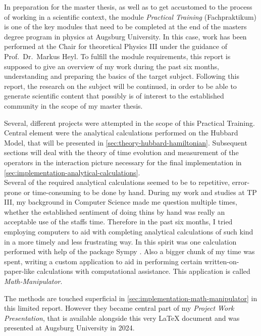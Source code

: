 In preparation for the master thesis, as well as to get accustomed to the process of working in a scientific context, the module \emph{Practical Training} (\glqq Fachpraktikum\grqq{}) is one of the key modules that need to be completed at the end of the masters degree program in physics at Augsburg University.
In this case, work has been performed at the Chair for theoretical Physics III under the guidance of  Prof.~Dr.~Markus Heyl.
To fulfill the module requirements, this report is supposed to give an overview of my work during the past six months, understanding and preparing the basics of the target subject.
Following this report, the research on the subject will be continued, in order to be able to generate scientific content that possibly is of interest to the established community in the scope of my master thesis.

Several, different projects were attempted in the scope of this Practical Training. 
Central element were the analytical calculations performed on the Hubbard Model, that will be presented in \autoref{sec:theory-hubbard-hamiltonian}.
Subsequent sections will deal with the theory of time evolution and measurement of the operators in the interaction picture necessary for the final implementation in \autoref{sec:implementation-analytical-calculations}.\\

Several of the required analytical calculations seemed to be to repetitive, error-prone or time-consuming to be done by hand. 
During my work and studies at TP III, my background in Computer Science made me question multiple times, whether the established sentiment of doing thins \glqq by hand\grqq{} was really an acceptable use of the staffs time.
Therefore in the past six months, I tried employing computers to aid with completing analytical calculations of such kind in a more timely and less frustrating way.
In this spirit was one calculation performed with help of the package Sympy \cite{sympyPackage}.
Also a bigger chunk of my time was spent, writing a custom application to aid in performing certain \glqq written-on-paper-like\grqq{} calculations with computational assistance. This application is called \emph{Math-Manipulator}.

The methods are touched superficial in \autoref{sec:implementation-math-manipulator} in this limited report. 
However they became central part of my \emph{Project Work Presentation}, that is available alongside this very LaTeX document \cite{selfDocument} and was presented at Augsburg University in 2024.
